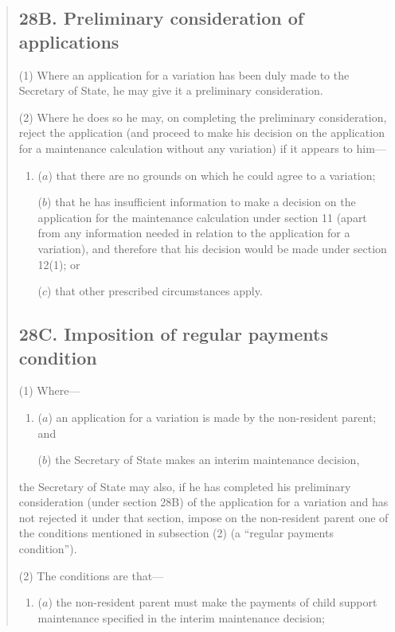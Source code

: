 \documentclass[12pt,a4paper]{article}
\begin{document}
\begin{quotation}
\subsection*{28B. Preliminary consideration of applications}

(1) Where an application for a variation has been duly made to the Secretary of State, he may give it a preliminary consideration.

(2) Where he does so he may, on completing the preliminary consideration, reject the application (and proceed to make his decision on the application for a maintenance calculation without any variation) if it appears to him—
\begin{enumerate}\item[]
($a$) that there are no grounds on which he could agree to a variation;

($b$) that he has insufficient information to make a decision on the application for the maintenance calculation under section 11 (apart from any information needed in relation to the application for a variation), and therefore that his decision would be made under section 12(1); or

($c$) that other prescribed circumstances apply.
\end{enumerate}

\subsection*{28C. Imposition of regular payments condition}

(1) Where—
\begin{enumerate}\item[]
($a$) an application for a variation is made by the non-resident parent; and

($b$) the Secretary of State makes an interim maintenance decision,
\end{enumerate}
the Secretary of State may also, if he has completed his preliminary consideration (under section 28B) of the application for a variation and has not rejected it under that section, impose on the non-resident parent one of the conditions mentioned in subsection (2)  (a “regular payments condition”).

(2) The conditions are that—
\begin{enumerate}\item[]
($a$) the non-resident parent must make the payments of child support maintenance specified in the interim maintenance decision;


\end{enumerate}
\end{quotation}
\end{document}
